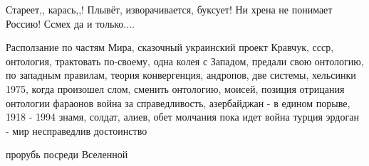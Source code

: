 Стареет,, карась,,! Плывёт, изворачивается, буксует! Ни хрена не понимает
Россию! Ссмех да и только.... 





Расползание по частям Мира, сказочный украинский проект
Кравчук, ссср, онтология, трактовать по-своему,
одна колея с Западом, предали свою онтологию, по западным правилам,
теория конвергенция, андропов, две системы, хельсинки 1975,
когда произошел слом, сменить онтологию, моисей,
позиция отрицания онтологии фараонов
война за справедливость, азербайджан - в едином порыве, 1918 - 1994 знамя,
солдат, алиев, обет молчания пока идет война турция эрдоган - мир несправедлив
достоинство

прорубь посреди Вселенной




